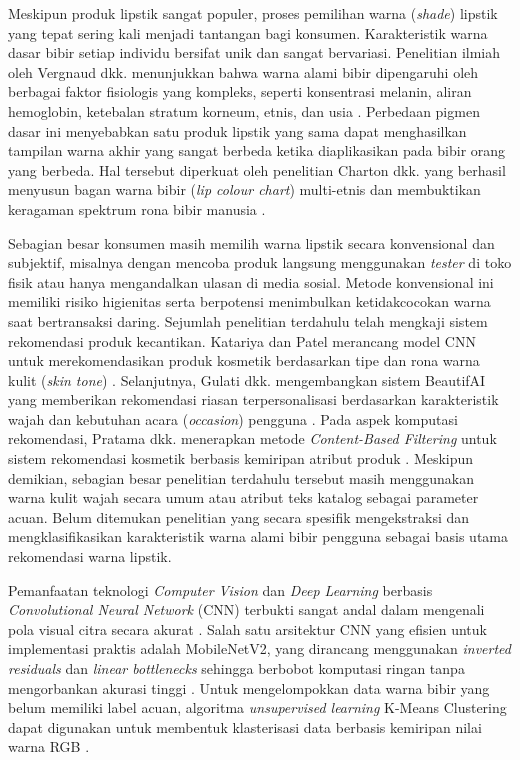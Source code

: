 \documentclass[10pt,a4paper]{article}
\begin{document}
Meskipun produk lipstik sangat populer, proses pemilihan warna (\textit{shade}) lipstik yang tepat sering kali menjadi tantangan bagi konsumen. Karakteristik warna dasar bibir setiap individu bersifat unik dan sangat bervariasi. Penelitian ilmiah oleh Vergnaud dkk. menunjukkan bahwa warna alami bibir dipengaruhi oleh berbagai faktor fisiologis yang kompleks, seperti konsentrasi melanin, aliran hemoglobin, ketebalan stratum korneum, etnis, dan usia \cite{vergnaud2024lip, vergnaud2023measurement}. Perbedaan pigmen dasar ini menyebabkan satu produk lipstik yang sama dapat menghasilkan tampilan warna akhir yang sangat berbeda ketika diaplikasikan pada bibir orang yang berbeda. Hal tersebut diperkuat oleh penelitian Charton dkk. yang berhasil menyusun bagan warna bibir (\textit{lip colour chart}) multi-etnis dan membuktikan keragaman spektrum rona bibir manusia \cite{charton2026development}.

Sebagian besar konsumen masih memilih warna lipstik secara konvensional dan subjektif, misalnya dengan mencoba produk langsung menggunakan \textit{tester} di toko fisik atau hanya mengandalkan ulasan di media sosial. Metode konvensional ini memiliki risiko higienitas serta berpotensi menimbulkan ketidakcocokan warna saat bertransaksi daring. Sejumlah penelitian terdahulu telah mengkaji sistem rekomendasi produk kecantikan. Katariya dan Patel merancang model CNN untuk merekomendasikan produk kosmetik berdasarkan tipe dan rona warna kulit (\textit{skin tone}) \cite{katariya2025novel}. Selanjutnya, Gulati dkk. mengembangkan sistem BeautifAI yang memberikan rekomendasi riasan terpersonalisasi berdasarkan karakteristik wajah dan kebutuhan acara (\textit{occasion}) pengguna \cite{gulati2023beautifai}. Pada aspek komputasi rekomendasi, Pratama dkk. menerapkan metode \textit{Content-Based Filtering} untuk sistem rekomendasi kosmetik berbasis kemiripan atribut produk \cite{pratama2025sistem}. Meskipun demikian, sebagian besar penelitian terdahulu tersebut masih menggunakan warna kulit wajah secara umum atau atribut teks katalog sebagai parameter acuan. Belum ditemukan penelitian yang secara spesifik mengekstraksi dan mengklasifikasikan karakteristik warna alami bibir pengguna sebagai basis utama rekomendasi warna lipstik.

Pemanfaatan teknologi \textit{Computer Vision} dan \textit{Deep Learning} berbasis \textit{Convolutional Neural Network} (CNN) terbukti sangat andal dalam mengenali pola visual citra secara akurat \cite{szeliski2022computer, goodfellow2016deep, lecun2015deep}. Salah satu arsitektur CNN yang efisien untuk implementasi praktis adalah MobileNetV2, yang dirancang menggunakan \textit{inverted residuals} dan \textit{linear bottlenecks} sehingga berbobot komputasi ringan tanpa mengorbankan akurasi tinggi \cite{sandler2018mobilenetv2, howard2017mobilenets}. Untuk mengelompokkan data warna bibir yang belum memiliki label acuan, algoritma \textit{unsupervised learning} K-Means Clustering dapat digunakan untuk membentuk klasterisasi data berbasis kemiripan nilai warna RGB \cite{macqueen1967methods, pedregosa2011scikit}.
\end{document}
